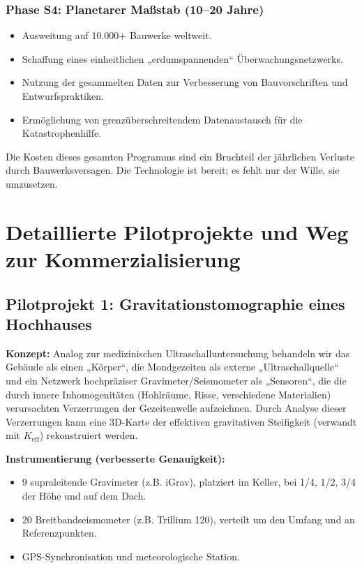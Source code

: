 \documentclass[12pt,a4paper]{article}
\theoremstyle{remark}
\newcommand{\Keff}{K_{\mathrm{eff}}}
\begin{document}
	\subsubsection{Phase S4: Planetarer Maßstab (10–20 Jahre)}
	
	\begin{itemize}
		\item Ausweitung auf 10.000+ Bauwerke weltweit.
		\item Schaffung eines einheitlichen „erdumspannenden“ Überwachungsnetzwerks.
		\item Nutzung der gesammelten Daten zur Verbesserung von Bauvorschriften und Entwurfspraktiken.
		\item Ermöglichung von grenzüberschreitendem Datenaustausch für die Katastrophenhilfe.
	\end{itemize}
	
	Die Kosten dieses gesamten Programms sind ein Bruchteil der jährlichen Verluste durch Bauwerksversagen. Die Technologie ist bereit; es fehlt nur der Wille, sie umzusetzen.
	
	\section{Detaillierte Pilotprojekte und Weg zur Kommerzialisierung}
	
	\subsection{Pilotprojekt 1: Gravitationstomographie eines Hochhauses}
	
	\textbf{Konzept:} Analog zur medizinischen Ultraschalluntersuchung behandeln wir das Gebäude als einen „Körper“, die Mondgezeiten als externe „Ultraschallquelle“ und ein Netzwerk hochpräziser Gravimeter/Seismometer als „Sensoren“, die die durch innere Inhomogenitäten (Hohlräume, Risse, verschiedene Materialien) verursachten Verzerrungen der Gezeitenwelle aufzeichnen. Durch Analyse dieser Verzerrungen kann eine 3D-Karte der effektiven gravitativen Steifigkeit (verwandt mit $\Keff$) rekonstruiert werden.
	
	\textbf{Instrumentierung (verbesserte Genauigkeit):}
	\begin{itemize}
		\item 9 supraleitende Gravimeter (z.B. iGrav), platziert im Keller, bei 1/4, 1/2, 3/4 der Höhe und auf dem Dach.
		\item 20 Breitbandseismometer (z.B. Trillium 120), verteilt um den Umfang und an Referenzpunkten.
		\item GPS-Synchronisation und meteorologische Station.
	\end{itemize}
	
\end{document}
